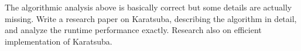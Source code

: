 The algorithmic analysis above is basically correct
but some details are actually missing.
Write a research paper on Karatsuba, describing the algorithm in detail,
and analyze the runtime performance exactly.
Research also on efficient implementation of Karatsuba.
